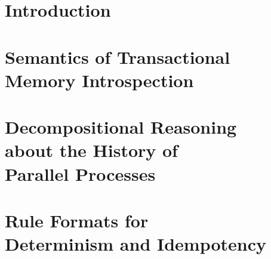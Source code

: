 \documentclass[10pt]{book}
\makeatletter
\theoremstyle{definition}
\theoremstyle{definition}
\newcommand\jointwith\relax
\renewcommand\tableofcontents{%
    \if@twocolumn
      \@restonecoltrue\onecolumn
    \else
      \@restonecolfalse
    \fi
    \chapter*{\contentsname
        \@mkboth{%
           {\upshape\scshape\MakeLowercase\contentsname}}{{\upshape\scshape\MakeLowercase\contentsname}}}%
    \@starttoc{toc}%
    \if@restonecol\twocolumn\fi
    }
\makeatother
\begin{document}
\tableofcontents

\mainmatter{}

\chapter{Introduction}


\renewcommand{\jointwith}{\'Ulfar Erlingsson}
\chapter{Semantics of Transactional Memory Introspection}
\label{ch:tmi}








\renewcommand{\jointwith}{Luca Aceto, Anna Ing\'olfsdottir,\\ and MohammadReza Mousavi}
\chapter[Decompositional Reasoning about the History of Parallel Processes]{Decompositional Reasoning \\ about the History of \\ Parallel Processes}
\label{ch:decomp}







\renewcommand{\trans}[1]{\,{\stackrel{{#1}}{\rightarrow}}\,}

\renewcommand{\jointwith}{Luca Aceto, Anna Ing\'olfsdottir,\\ MohammadReza Mousavi and Michel Reniers}
\chapter[Rule Formats for Determinism and Idempotency]{Rule Formats for \\ Determinism and Idempotency}
\label{ch:formats}








\end{document}
